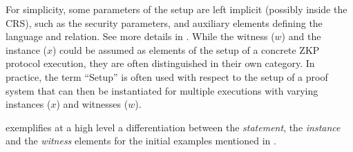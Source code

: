 	For simplicity, some parameters of the setup are left implicit (possibly inside the CRS), 
such as the security parameters, and auxiliary elements defining the language and relation.
See more details in .
	While the witness ($w$) and the instance ($x$) could be assumed as elements of the setup 
of a concrete ZKP protocol execution, they are often distinguished in their own category. 
	In practice, the term ``Setup'' is often used with respect to the setup of a proof system that can then be instantiated for multiple executions with varying instances ($x$) and witnesses ($w$).


 exemplifies at a high level a differentiation between the \emph{statement}, the \emph{instance} and the \emph{witness} elements for the initial examples mentioned in .


